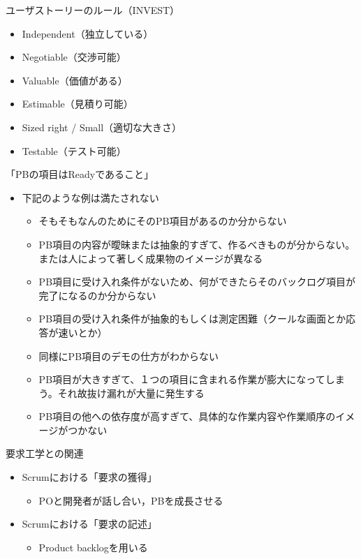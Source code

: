 \documentclass[t]{beamer}
\begin{document}
\begin{frame}[label=sec-6]{ユーザストーリーのルール（INVEST）}
\begin{itemize}
\item Independent（独立している）
\item Negotiable（交渉可能）
\item Valuable（価値がある）
\item Estimable（見積り可能）
\item Sized right / Small（適切な大きさ）
\item Testable（テスト可能）
\end{itemize}
\end{frame}

\begin{frame}[label=sec-7]{「PBの項目はReadyであること」}
\begin{itemize}
\item 下記のような例は満たされない
\begin{itemize}
\item そもそもなんのためにそのPB項目があるのか分からない
\item PB項目の内容が曖昧または抽象的すぎて、作るべきものが分からない。または人によって著しく成果物のイメージが異なる
\item PB項目に受け入れ条件がないため、何ができたらそのバックログ項目が完了になるのか分からない
\item PB項目の受け入れ条件が抽象的もしくは測定困難（クールな画面とか応答が速いとか）
\item 同様にPB項目のデモの仕方がわからない
\item PB項目が大きすぎて、１つの項目に含まれる作業が膨大になってしまう。それ故抜け漏れが大量に発生する
\item PB項目の他への依存度が高すぎて、具体的な作業内容や作業順序のイメージがつかない
\end{itemize}
\end{itemize}
\end{frame}

\begin{frame}[label=sec-8]{要求工学との関連}
\begin{itemize}
\item Scrumにおける「要求の獲得」
\begin{itemize}
\item POと開発者が話し合い，PBを成長させる
\end{itemize}
\item Scrumにおける「要求の記述」
\begin{itemize}
\item Product backlogを用いる
\end{itemize}
\end{itemize}
\end{frame}
\end{document}

